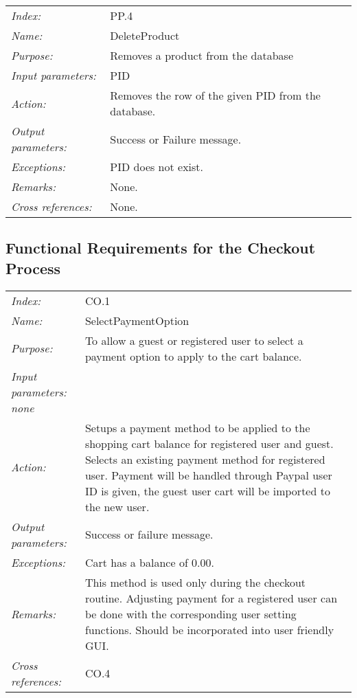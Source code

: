 \documentclass[10pt,letter]{article}
\begin{document}
\begin{tabularx}{\textwidth}{l X}
    \it{Index:} & PP.4 \\
    \it{Name:} & DeleteProduct \\
    \it{Purpose:} & Removes a product from the database\\
    \it{Input parameters:} & PID\\
    \it{Action:} & Removes the row of the given PID from the database.\\
    \it{Output parameters:} & Success or Failure message. \\
    \it{Exceptions:} & PID does not exist. \\
    \it{Remarks:} & None. \\
    \it{Cross references:} & None. \\
    \hline
\end{tabularx}

\subsection{Functional Requirements for the Checkout Process}

\begin{tabularx}{\textwidth}{l X}
    \it{Index:} & CO.1 \\
    \it{Name:} & SelectPaymentOption \\
    \it{Purpose:} & To allow a guest or registered user to select a payment option to apply to the cart balance. \\
    \it{Input parameters:} none \\
    \it{Action:} & Setups a payment method to be applied to the shopping cart balance for registered user and guest. Selects an existing payment method for registered user. Payment will be handled through Paypal
    user ID is given, the guest user cart will be imported to the new user.\\
    \it{Output parameters:} & Success or failure message. \\
    \it{Exceptions:} &  Cart has a balance of $0.00$. \\
    \it{Remarks:} & This method is used only during the checkout routine. Adjusting payment for a registered user can be done with the corresponding user setting functions. Should be incorporated into user friendly GUI.\\
    \it{Cross references:} & CO.4 \\
    \hline
\end{tabularx}
\end{document}
